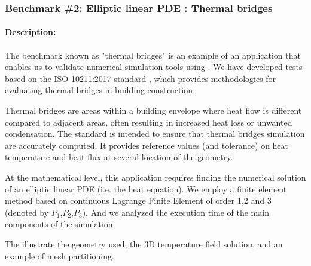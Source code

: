 \subsubsection{Benchmark \#2: Elliptic linear PDE : Thermal bridges}
\label{sec:WP1:Feelpp:benchmark:thermal_bridges}
\paragraph{Description:} %

The benchmark known as "thermal bridges" is an example of an application that
enables us to validate numerical simulation tools using \Feelpp. We have
developed tests based on the ISO 10211:2017 standard
, which provides methodologies for evaluating
thermal bridges in building construction.

Thermal bridges are areas within a building envelope where heat
flow is different compared to adjacent areas, often resulting in increased heat
loss or unwanted condensation.
The standard is intended to ensure that thermal
bridges simulation are accurately computed. It provides reference values (and tolerance) on heat
temperature and heat flux at several location of the geometry.

At the mathematical level, this application requires finding the numerical
solution of an elliptic linear PDE (i.e. the heat equation). We employ a
finite element method based on continuous Lagrange Finite Element of order 1,2
and 3 (denoted by $P_1$,$P_2$,$P_3$). And we analyzed the execution time of the
main components of the simulation.

The  illustrate the geometry
used, the 3D temperature field solution, and an example of mesh partitioning.



